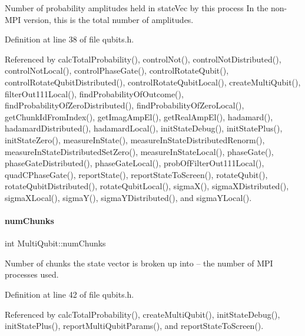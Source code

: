 Number of probability amplitudes held in state\+Vec by this process In the non-\/\+M\+PI version, this is the total number of amplitudes. 



Definition at line 38 of file qubits.\+h.



Referenced by calc\+Total\+Probability(), control\+Not(), control\+Not\+Distributed(), control\+Not\+Local(), control\+Phase\+Gate(), control\+Rotate\+Qubit(), control\+Rotate\+Qubit\+Distributed(), control\+Rotate\+Qubit\+Local(), create\+Multi\+Qubit(), filter\+Out111\+Local(), find\+Probability\+Of\+Outcome(), find\+Probability\+Of\+Zero\+Distributed(), find\+Probability\+Of\+Zero\+Local(), get\+Chunk\+Id\+From\+Index(), get\+Imag\+Amp\+El(), get\+Real\+Amp\+El(), hadamard(), hadamard\+Distributed(), hadamard\+Local(), init\+State\+Debug(), init\+State\+Plus(), init\+State\+Zero(), measure\+In\+State(), measure\+In\+State\+Distributed\+Renorm(), measure\+In\+State\+Distributed\+Set\+Zero(), measure\+In\+State\+Local(), phase\+Gate(), phase\+Gate\+Distributed(), phase\+Gate\+Local(), prob\+Of\+Filter\+Out111\+Local(), quad\+C\+Phase\+Gate(), report\+State(), report\+State\+To\+Screen(), rotate\+Qubit(), rotate\+Qubit\+Distributed(), rotate\+Qubit\+Local(), sigma\+X(), sigma\+X\+Distributed(), sigma\+X\+Local(), sigma\+Y(), sigma\+Y\+Distributed(), and sigma\+Y\+Local().

\mbox{\label{structMultiQubit_acd43f2f57991709c9e94f73662c972b2}} 
\paragraph{\texorpdfstring{num\+Chunks}{numChunks}}
{\footnotesize\ttfamily int Multi\+Qubit\+::num\+Chunks}



Number of chunks the state vector is broken up into -- the number of M\+PI processes used. 



Definition at line 42 of file qubits.\+h.



Referenced by calc\+Total\+Probability(), create\+Multi\+Qubit(), init\+State\+Debug(), init\+State\+Plus(), report\+Multi\+Qubit\+Params(), and report\+State\+To\+Screen().

\mbox{\label{structMultiQubit_ab5b9795bdc6fb5855e1974dcbbaeb36f}} 
